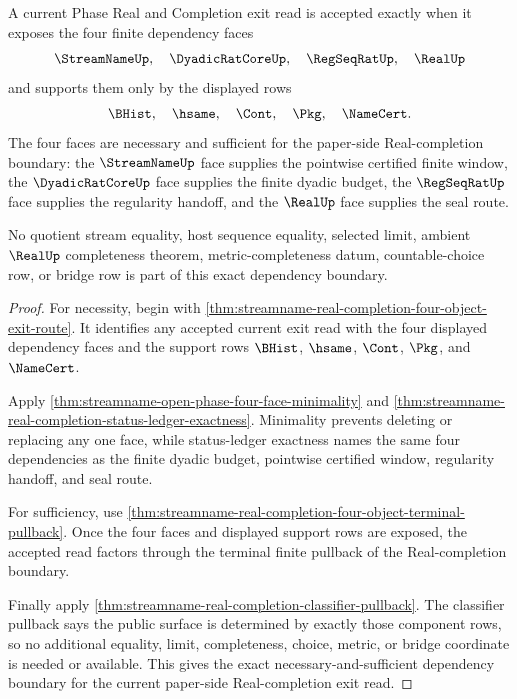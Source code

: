 \begin{theorem}
\label{thm:streamname-real-completion-dependency-exactness}
A current Phase Real and Completion exit read is accepted exactly when it exposes the four finite dependency faces
$$
\StreamNameUp,\quad \DyadicRatCoreUp,\quad \RegSeqRatUp,\quad \RealUp
$$
and supports them only by the displayed rows
$$
\BHist,\quad \hsame,\quad \Cont,\quad \Pkg,\quad \NameCert.
$$
The four faces are necessary and sufficient for the paper-side Real-completion boundary: the $\StreamNameUp$ face supplies the pointwise certified finite window, the $\DyadicRatCoreUp$ face supplies the finite dyadic budget, the $\RegSeqRatUp$ face supplies the regularity handoff, and the $\RealUp$ face supplies the seal route.

No quotient stream equality, host sequence equality, selected limit, ambient $\RealUp$ completeness theorem, metric-completeness datum, countable-choice row, or bridge row is part of this exact dependency boundary.
\end{theorem}
\begin{proof}
For necessity, begin with \autoref{thm:streamname-real-completion-four-object-exit-route}. It identifies any accepted current exit read with the four displayed dependency faces and the support rows $\BHist$, $\hsame$, $\Cont$, $\Pkg$, and $\NameCert$.

Apply \autoref{thm:streamname-open-phase-four-face-minimality} and \autoref{thm:streamname-real-completion-status-ledger-exactness}. Minimality prevents deleting or replacing any one face, while status-ledger exactness names the same four dependencies as the finite dyadic budget, pointwise certified window, regularity handoff, and seal route.

For sufficiency, use \autoref{thm:streamname-real-completion-four-object-terminal-pullback}. Once the four faces and displayed support rows are exposed, the accepted read factors through the terminal finite pullback of the Real-completion boundary.

Finally apply \autoref{thm:streamname-real-completion-classifier-pullback}. The classifier pullback says the public surface is determined by exactly those component rows, so no additional equality, limit, completeness, choice, metric, or bridge coordinate is needed or available. This gives the exact necessary-and-sufficient dependency boundary for the current paper-side Real-completion exit read.
\end{proof}

